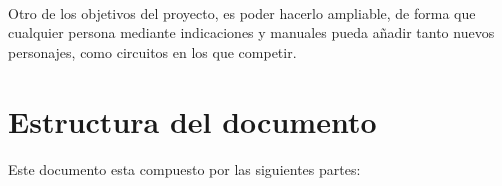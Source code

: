 \paragraph{}
Otro de los objetivos del proyecto, es poder hacerlo ampliable, de forma que cualquier persona mediante indicaciones y manuales
pueda añadir tanto nuevos personajes, como circuitos en los que competir.

\section{Estructura del documento}

\paragraph{}
Este documento esta compuesto por las siguientes partes:

